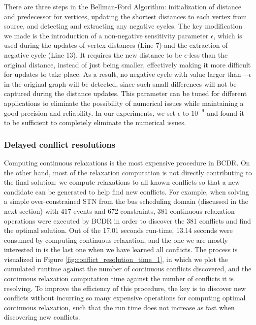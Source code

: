 \documentclass[jair,twoside,11pt,theapa]{article}
\begin{document}
There are three steps in the Bellman-Ford Algorithm: initialization of distance
and predecessor for vertices, updating the shortest distances to each vertex
from source, and detecting and extracting any negative cycles. The key
modification we made is the introduction of a non-negative sensitivity parameter
$\epsilon$, which is used during the updates of vertex distances (Line 7) and
the extraction of negative cycle (Line 13). It requires the new distance to be
$\epsilon$-less than the original distance, instead of just being smaller,
effectively making it more difficult for updates to take place. As a result, no
negative cycle with value larger than $-\epsilon$ in the original graph will be
detected, since such small differences will not be captured during the distance
updates. This parameter can be tuned for different applications to eliminate the
possibility of numerical issues while maintaining a good precision and
reliability. In our experiments, we set $\epsilon$ to $10^{-9}$ and found it to
be sufficient to completely eliminate the numerical issues.


\subsubsection{Delayed conflict resolutions}


Computing continuous relaxations is the most expensive procedure in BCDR. On the other hand, most of the
relaxation computation is not directly contributing to the final solution: we
compute relaxations to all known conflicts so that a new candidate can be generated
to help find new conflicts. For example, when solving a simple over-constrained
STN from the bus scheduling domain (discussed in the next section) with 417
events and 672 constraints, 381 continuous relaxation operations were executed
by BCDR in order to discover the 381 conflicts and find the optimal solution.
Out of the 17.01 seconds run-time, 13.14 seconds were consumed by computing continuous
relaxation, and the one we are mostly interested in is the last one when we have
learned all conflicts. The process is visualized in Figure
\ref{fig:conflict_resolution_time_1}, in which we plot the cumulated runtime
against the number of continuous conflicts discovered, and the continuous relaxation computation time against
the number of conflicts it is resolving. To improve the efficiency of this
procedure, the key is to discover new conflicts without incurring so many
expensive operations for computing optimal continuous relaxation, such
that the run time does not increase as fast when discovering new conflicts.
\end{document}
